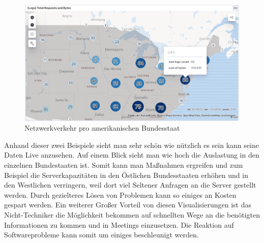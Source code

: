 \begin{figure}[H]
    \flushleft
    \includegraphics[scale=0.85]{images/sampleLogs2.PNG}
    \caption{Netzwerkverkehr pro amerikanischen Bundesstaat}
\end{figure}
Anhand dieser zwei Beispiele sieht man sehr schön wie nützlich es sein kann seine Daten Live anzusehen. Auf einem Blick sieht man wie hoch die Auslastung in den einzelnen Bundestaaten ist. Somit kann man Maßnahmen ergreifen und zum Beispiel die Serverkapazitäten in den Östlichen Bundesstaaten erhöhen und in den Westlichen verringern, weil dort viel Seltener Anfragen an die Server gestellt werden. Durch gezielteres Lösen von Problemen kann so einiges an Kosten gespart werden. Ein weiterer Großer Vorteil von diesen Visualisierungen ist das Nicht-Techniker die Möglichkeit bekommen auf schnellten Wege an die benötigten Informationen zu kommen und in Meetings einzusetzen. Die Reaktion auf Softwareprobleme kann somit um einiges beschleunigt werden. 